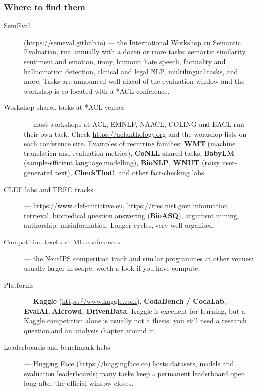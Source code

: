 \documentclass[11pt,a4paper]{article}
\begin{document}
\subsubsection*{Where to find them}

\begin{description}
  \item[SemEval] (\url{https://semeval.github.io}) --- the International
        Workshop on Semantic Evaluation, run annually with a dozen or more
        tasks: semantic similarity, sentiment and emotion, irony, humour,
        hate speech, factuality and hallucination detection, clinical and
        legal NLP, multilingual tasks, and more. Tasks are announced well
        ahead of the evaluation window and the workshop is co-located with a
        \mbox{*ACL} conference.
  \item[Workshop shared tasks at *ACL venues] --- most workshops at ACL,
        EMNLP, NAACL, COLING and EACL run their own task. Check
        \url{https://aclanthology.org} and the workshop lists on each
        conference site. Examples of recurring families: \textbf{WMT}
        (machine translation and evaluation metrics), \textbf{CoNLL} shared
        tasks, \textbf{BabyLM} (sample-efficient language modelling),
        \textbf{BioNLP}, \textbf{WNUT} (noisy user-generated text),
        \textbf{CheckThat!}~and other fact-checking labs.
  \item[CLEF labs and TREC tracks] --- \url{https://www.clef-initiative.eu},
        \url{https://trec.nist.gov}: information retrieval, biomedical
        question answering (\textbf{BioASQ}), argument mining, authorship,
        misinformation. Longer cycles, very well organised.
  \item[Competition tracks at ML conferences] --- the NeurIPS competition
        track and similar programmes at other venues: usually larger in scope,
        worth a look if you have compute.
  \item[Platforms] --- \textbf{Kaggle} (\url{https://www.kaggle.com}),
        \textbf{CodaBench / CodaLab}, \textbf{EvalAI},
        \textbf{AIcrowd}, \textbf{DrivenData}. Kaggle is excellent for
        learning, but a Kaggle competition alone is usually not a thesis:
        you still need a research question and an analysis chapter around it.
  \item[Leaderboards and benchmark hubs] --- Hugging Face
        (\url{https://huggingface.co}) hosts datasets, models and evaluation
        leaderboards; many tasks keep a permanent leaderboard open long after
        the official window closes.
\end{description}
\end{document}
